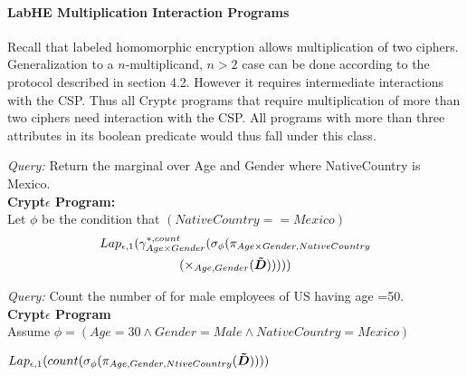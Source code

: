 \paragraph{\textbf{LabHE Multiplication Interaction Programs}}
Recall that labeled homomorphic encryption allows multiplication of two ciphers. Generalization to a $n$-multiplicand, $n > 2$ case can be done according to the protocol described in section 4.2. However it requires intermediate interactions with the \textsf{CSP}. Thus all Crypt$\epsilon$ programs that require multiplication of more than two ciphers need interaction with the \textsf{CSP}. 
All programs with more than three attributes in its boolean predicate would thus fall under this class.
\begin{exmp}\textit{Query:} Return the marginal over Age and Gender where NativeCountry is Mexico. \\\textbf{Crypt$\epsilon$ Program:}\\ Let $\phi$ be the condition that $(NativeCountry==Mexico) $ \begin{multline*}Lap_{\epsilon,1}(\gamma^{*,count}_{Age\times Gender}(\sigma_{\phi}(\pi_{Age\times Gender, NativeCountry}\\(\times_{Age,Gender}(\boldsymbol{\tilde{D}})))))\end{multline*}\end{exmp}%
\begin{exmp} \textit{Query:} Count the number of for male employees of US having age =50. \\\textbf{Crypt$\epsilon$ Program} \\Assume $\phi=(Age=30 \wedge Gender=Male \wedge NativeCountry=Mexico)$ \end{exmp} $Lap_{\epsilon,1}(count(\sigma_{\phi}(\pi_{Age,Gender,NtiveCountry}(\boldsymbol{\tilde{D}}))))$
